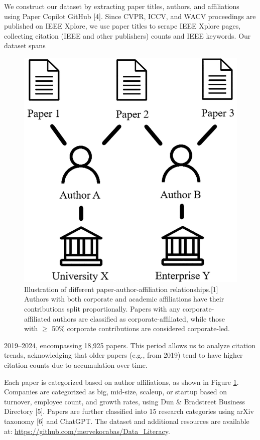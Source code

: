 \documentclass{article}
\begin{document}
We construct our dataset by extracting paper titles, authors, and affiliations using Paper Copilot GitHub [4]. Since CVPR, ICCV, and WACV proceedings are published on IEEE Xplore, we use paper titles to scrape IEEE Xplore pages, collecting citation (IEEE  and other publishers) counts and IEEE keywords. Our dataset spans 
\begin{figure}
\centering
\vspace{-10pt}
\includegraphics[width=.95\linewidth]{report/images/affiliation-combination.png}
\caption{Illustration of different paper-author-affiliation relationships.[1] Authors with both corporate and academic affiliations have their contributions split proportionally. Papers with any corporate-affiliated authors are classified as corporate-affiliated, while those with $\geq$ 50\% corporate contributions are considered corporate-led.}
\label{fig:affiliation-combination}
\vspace{-20pt}
\end{figure}
2019–2024, encompassing 18,925 papers. This period allows us to analyze citation trends, acknowledging that older papers (e.g., from 2019) tend to have higher citation counts due to accumulation over time.

Each paper is categorized based on author affiliations, as shown in Figure \ref{fig:affiliation-combination}. Companies are categorized as big, mid-size, scaleup, or startup based on turnover, employee count, and growth rates, using Dun \& Bradstreet Business Directory [5]. Papers are further classified into 15 research categories using arXiv taxonomy [6] and ChatGPT. The dataset and additional resources are available at: \url{https://github.com/mervekocabas/Data_Literacy}.
\end{document}
